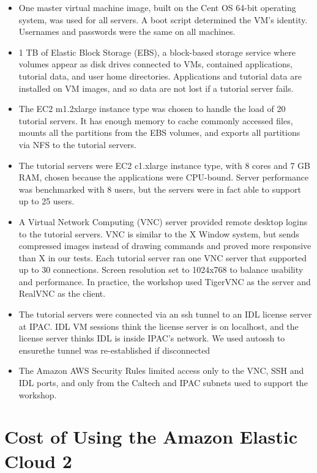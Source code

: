 \documentclass[11pt,twoside]{article}
\begin{document}

\begin{itemize}

\item One master virtual machine image, built on the Cent OS 64-bit operating system, was used for all servers.
A boot script determined the VM’s identity.
Usernames and passwords were the same on all machines. 
\item
1 TB of Elastic Block Storage (EBS), a 
block-based storage service where
volumes appear as disk drives connected to VMs,
contained applications, tutorial data, and user home directories. Applications and tutorial data are installed on VM images, and so data are not lost if a tutorial server fails.

\item
The EC2 m1.2xlarge instance type was chosen to handle the load of 20 tutorial servers. It has enough memory to cache commonly accessed files,  mounts all the partitions from the EBS volumes, and exports all partitions via NFS to the tutorial servers.
\item
The tutorial servers were EC2 c1.xlarge instance type, with 
8 cores and 7 GB RAM, chosen because the applications were CPU-bound.
Server performance was benchmarked with 8 users, but the servers were in fact able to support up to 25 users. 
\item
A Virtual Network Computing (VNC) server provided remote desktop logins to the tutorial servers. VNC is similar to the X Window system, but sends compressed images instead of drawing commands and proved more responsive than X in our tests. Each tutorial server ran one VNC server that supported up to 30 connections.  Screen resolution set to 1024x768 to balance usability and performance. In practice,  the workshop used TigerVNC as the server and RealVNC as the client.
\item
The tutorial servers were connected via an ssh tunnel to an IDL license server at IPAC. 
IDL VM sessions think the license server is on localhost, and the license server thinks IDL is inside IPAC's network. We used autossh to ensurethe tunnel was re-established if disconnected
\item
The Amazon AWS Security Rules limited access only to the VNC, SSH and IDL ports, and only from the Caltech and IPAC subnets  used to support the workshop.
\end{itemize}

\section{Cost of Using the Amazon Elastic Cloud 2}
\end{document}
